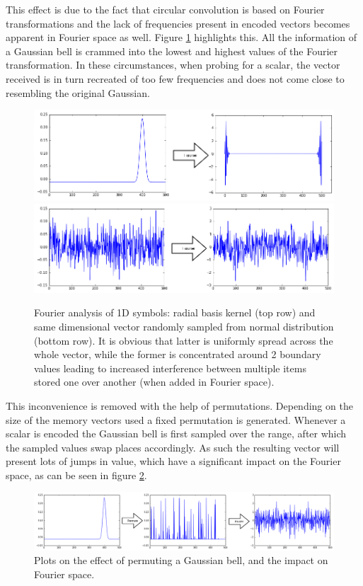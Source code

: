 \documentclass[conference]{IEEEtran}
\begin{document}
	This effect is due to the fact that circular convolution is based on Fourier transformations and the lack of frequencies present in encoded vectors becomes apparent in Fourier space as well.
Figure \ref{fft} highlights this.
All the information of a Gaussian bell is crammed into the lowest and highest values of the Fourier transformation.
In these circumstances, when probing for a scalar, the vector received is in turn recreated of too few frequencies and does not come close to resembling the original Gaussian.

	
	\begin{figure}
		\includegraphics[width=\columnwidth]{img/scalar-pre-perm-fft.png}
		\includegraphics[width=\columnwidth]{img/scalar-random-fft.png}
		\caption{Fourier analysis of 1D symbols: radial basis kernel (top row) and same dimensional vector randomly sampled from normal distribution (bottom row). It is obvious that latter is uniformly spread across the whole vector, while the former is concentrated around 2 boundary values leading to increased interference between multiple items stored one over another (when added in Fourier space).}
		\label{fft}
	\end{figure}
	
	This inconvenience is removed with the help of permutations.
Depending on the size of the memory vectors used a fixed permutation is generated.
Whenever a scalar is encoded the Gaussian bell is first sampled over the range, after which the sampled values swap places accordingly.
As such the resulting vector will present lots of jumps in value, which have a significant impact on the Fourier space, as can be seen in figure \ref{perm-fft}.
	
	\begin{figure}
		\includegraphics[width=\columnwidth]{img/scalar-perm-step-fft.png}
		\caption{Plots on the effect of permuting a Gaussian bell, and the impact on Fourier space.}
		\label{perm-fft}
	\end{figure}
	
\end{document}
